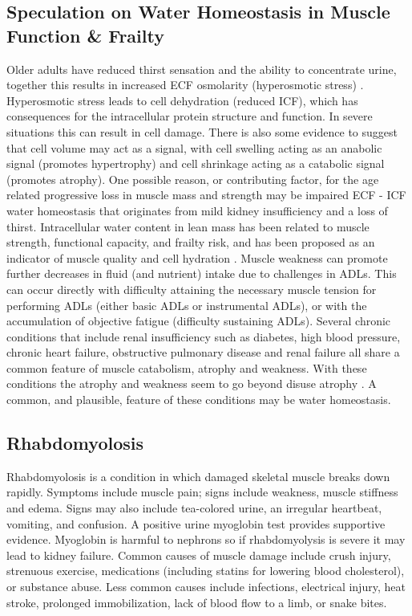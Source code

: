 \subsection{Speculation on Water Homeostasis in Muscle Function \& Frailty}
Older adults have reduced thirst sensation and the ability to concentrate urine, together this results in increased ECF osmolarity (hyperosmotic stress) \cite{lorenzo_role_2019}. Hyperosmotic stress leads to cell dehydration (reduced ICF), which has consequences for the intracellular protein structure and function. In severe situations this can result in cell damage. There is also some evidence to suggest that cell volume may act as a signal, with cell swelling acting as an anabolic signal (promotes hypertrophy) and cell shrinkage acting as a catabolic signal (promotes atrophy). One possible reason, or contributing factor, for the age related progressive loss in muscle mass and strength may be impaired ECF - ICF water homeostasis that originates from mild kidney insufficiency and a loss of thirst. Intracellular water content in lean mass has been related to muscle strength, functional capacity, and frailty risk, and has been proposed as an indicator of muscle quality and cell hydration \cite{lorenzo_role_2019}. Muscle weakness can promote further decreases in fluid (and nutrient) intake due to challenges in ADLs. This can occur directly with difficulty attaining the necessary muscle tension for performing ADLs (either basic ADLs or instrumental ADLs), or with the accumulation of objective fatigue (difficulty sustaining ADLs)\cite{collins_heart_2015}.  Several chronic conditions that include renal insufficiency such as diabetes, high blood pressure, chronic heart failure, obstructive pulmonary disease and renal failure all share a common feature of muscle catabolism, atrophy and weakness. With these conditions the atrophy and weakness seem to go beyond disuse atrophy \cite{adams_skeletal_2006}. A common, and plausible, feature of these conditions may be water homeostasis. 

\subsection{Rhabdomyolosis}
Rhabdomyolosis is a condition in which damaged skeletal muscle breaks down rapidly. Symptoms include muscle pain; signs include weakness, muscle stiffness and edema. Signs may also include tea-colored urine, an irregular heartbeat, vomiting, and confusion. A positive urine myoglobin test provides supportive evidence. Myoglobin is harmful to nephrons so if rhabdomyolysis is severe it may lead to kidney failure. Common causes of muscle damage include crush injury, strenuous exercise, medications (including statins for lowering blood cholesterol), or substance abuse. Less common causes include infections, electrical injury, heat stroke, prolonged immobilization, lack of blood flow to a limb, or snake bites.

